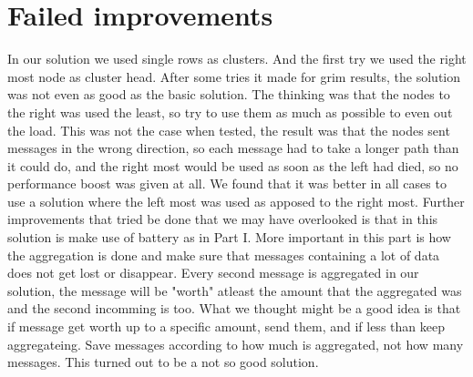 \documentclass{article}
\begin{document}
  \section{Failed improvements}
  In our solution we used single rows as clusters. And the first try we used the 
  right most node as cluster head. After some tries it made for grim results, the solution 
  was not even as good as the basic solution. The thinking was that the nodes
  to the right was used the least, so try to use them as much as possible to
  even out the load. This was not the case when tested, the result was that
  the nodes sent messages in the wrong direction, so each message had to take a 
  longer path than it could do, and the right most would be used as soon as the
  left had died, so no performance boost was given at all. We found that it
  was better in all cases to use a solution where the left most
  was used as apposed to the right most. Further improvements that tried be done
  that we may have overlooked is that in this solution is make use of battery
  as in Part I. More important in this part is how the aggregation is done
  and make sure that messages containing a lot of data does not get lost or
  disappear. Every second message is aggregated in our solution, the message 
  will be "worth" atleast the amount that the aggregated was and the second incomming
  is too. What we thought might be a good idea is that if message get worth up to a
  specific amount, send them, and if less than keep aggregateing. Save messages
  according to how much is aggregated, not how many messages. This turned out to
  be a not so good solution.

  
\end{document}
